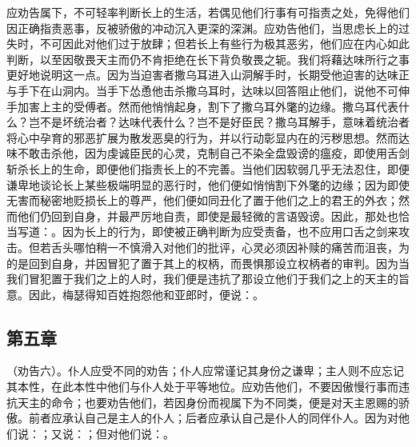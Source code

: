 应劝告属下，不可轻率判断长上的生活，若偶见他们行事有可指责之处，免得他们因正确指责恶事，反被骄傲的冲动沉入更深的深渊。应劝告他们，当思虑长上的过失时，不可因此对他们过于放肆；但若长上有些行为极其恶劣，他们应在内心如此判断，以至因敬畏天主而仍不肯拒绝在长下背负敬畏之轭。我们将藉达味所行之事更好地说明这一点。因为当迫害者撒乌耳进入山洞解手时，长期受他迫害的达味正与手下在山洞内。当手下怂恿他击杀撒乌耳时，达味以回答阻止他们，说他不可伸手加害上主的受傅者。然而他悄悄起身，割下了撒乌耳外氅的边缘。撒乌耳代表什么？岂不是坏统治者？达味代表什么？岂不是好臣民？撒乌耳解手，意味着统治者将心中孕育的邪恶扩展为散发恶臭的行为，并以行动彰显内在的污秽思想。然而达味不敢击杀他，因为虔诚臣民的心灵，克制自己不染全盘毁谤的瘟疫，即使用舌剑斩杀长上的生命，即便他们指责长上的不完善。当他们因软弱几乎无法忍住，即便谦卑地谈论长上某些极端明显的恶行时，他们便如悄悄割下外氅的边缘；因为即使无害而秘密地贬损长上的尊严，他们便如同丑化了置于他们之上的君王的外衣；然而他们仍回到自身，并最严厉地自责，即使是最轻微的言语毁谤。因此，那处也恰当写道：。因为长上的行为，即使被正确判断为应受责备，也不应用口舌之剑来攻击。但若舌头哪怕稍一不慎滑入对他们的批评，心灵必须因补赎的痛苦而沮丧，为的是回到自身，并因冒犯了置于其上的权柄，而畏惧那设立权柄者的审判。因为当我们冒犯置于我们之上的人时，我们便是违抗了那设立他们于我们之上的天主的旨意。因此，梅瑟得知百姓抱怨他和亚郎时，便说：。\par


\subsection{第五章}

\par

（劝告六）。仆人应受不同的劝告；仆人应常谨记其身份之谦卑；主人则不应忘记其本性，在此本性中他们与仆人处于平等地位。应劝告他们，不要因傲慢行事而违抗天主的命令；也要劝告他们，若因身份而视属下为不同类，便是对天主恩赐的骄傲。前者应承认自己是主人的仆人；后者应承认自己是仆人的同伴仆人。因为对他们说：；又说：；但对他们说：。\par

